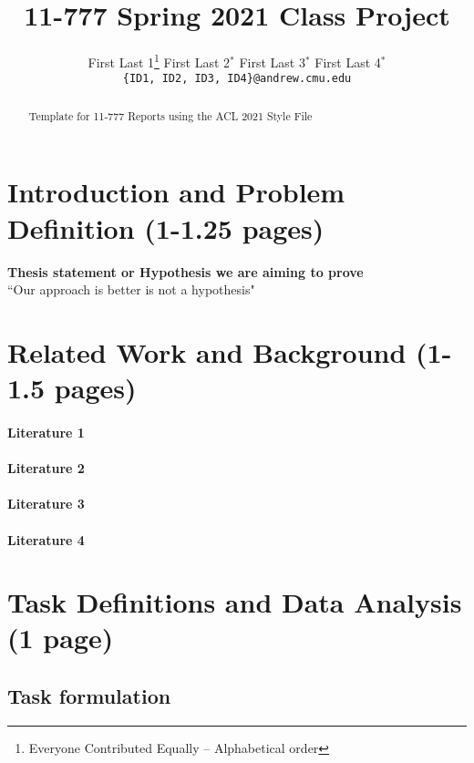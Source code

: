\documentclass[11pt,a4paper]{article}
\title{11-777 Spring 2021 Class Project}
\author{
  First Last 1\thanks{\hspace{4pt}Everyone Contributed Equally -- Alphabetical order} \hspace{2em} First Last 2$^*$ \hspace{2em} First Last 3$^*$ \hspace{2em} First Last 4$^*$ \\
  \texttt{\{ID1, ID2, ID3, ID4\}@andrew.cmu.edu}
  }
\date{}
\begin{document}
\maketitle
\begin{abstract}
Template for 11-777 Reports using the ACL 2021 Style File 
\end{abstract}

\section{Introduction and Problem Definition (1-1.25 pages)}
\textbf{Thesis statement or Hypothesis we are aiming to prove}\\
``Our approach is better is not a hypothesis"
\begin{figure}
\end{figure}

\clearpage
\section{Related Work and Background (1-1.5 pages)}
\paragraph{Literature 1}
\paragraph{Literature 2}
\paragraph{Literature 3}
\paragraph{Literature 4}

\clearpage
\section{Task Definitions and Data Analysis (1 page)}
\subsection{Task formulation}
\end{document}

